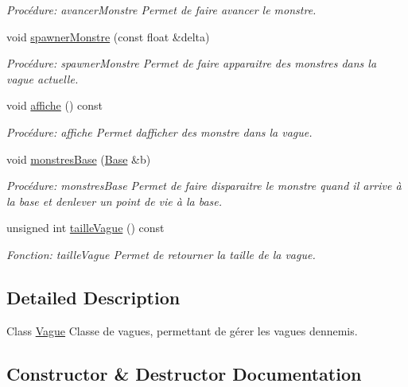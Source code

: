 \begin{DoxyCompactItemize}
\begin{DoxyCompactList}\small\item\em Procédure\+: avancer\+Monstre Permet de faire avancer le monstre. \end{DoxyCompactList}\item 
void \hyperlink{classVague_a2479faa494f68587eebb3c9e74407761}{spawner\+Monstre} (const float \&delta)
\begin{DoxyCompactList}\small\item\em Procédure\+: spawner\+Monstre Permet de faire apparaitre des monstres dans la vague actuelle. \end{DoxyCompactList}\item 
void \hyperlink{classVague_ae4f544e35c46d10f4545cd768c9af386}{affiche} () const
\begin{DoxyCompactList}\small\item\em Procédure\+: affiche Permet d\textquotesingle{}afficher des monstre dans la vague. \end{DoxyCompactList}\item 
void \hyperlink{classVague_ad9d543a1eafc579d8a4de88d278a53a7}{monstres\+Base} (\hyperlink{classBase}{Base} \&b)
\begin{DoxyCompactList}\small\item\em Procédure\+: monstres\+Base Permet de faire disparaitre le monstre quand il arrive à la base et d\textquotesingle{}enlever un point de vie à la base. \end{DoxyCompactList}\item 
unsigned int \hyperlink{classVague_a00fd363241fbfd6ed6819d408155a6ee}{taille\+Vague} () const
\begin{DoxyCompactList}\small\item\em Fonction\+: taille\+Vague Permet de retourner la taille de la vague. \end{DoxyCompactList}\end{DoxyCompactItemize}


\subsection{Detailed Description}
Class \hyperlink{classVague}{Vague} Classe de vagues, permettant de gérer les vagues d\textquotesingle{}ennemis. 

\subsection{Constructor \& Destructor Documentation}
\mbox{\label{classVague_ab1e4786aa02ad641431b56658dbbaac3}} 
